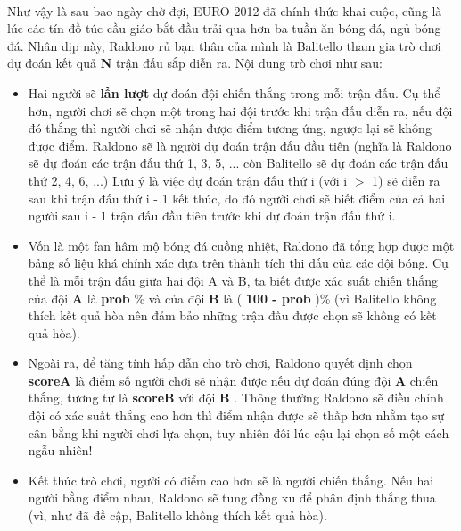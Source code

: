 

 

Như vậy là sau bao ngày chờ đợi, EURO 2012 đã chính thức khai cuộc, cũng là lúc các tín đồ túc cầu giáo bắt đầu trải qua hơn ba tuần ăn bóng đá, ngủ bóng đá. Nhân dịp này, Raldono rủ bạn thân của mình là Balitello tham gia trò chơi dự đoán kết quả \textbf{ N } trận đấu sắp diễn ra. Nội dung trò chơi như sau:
\begin{itemize}
	\item Hai người sẽ \textbf{ lần lượt } dự đoán đội chiến thắng trong mỗi trận đấu. Cụ thể hơn, người chơi sẽ chọn một trong hai đội trước khi trận đấu diễn ra, nếu đội đó thắng thì người chơi sẽ nhận được điểm tương ứng, ngược lại sẽ không được điểm. Raldono sẽ là người dự đoán trận đấu đầu tiên (nghĩa là Raldono sẽ dự đoán các trận đấu thứ 1, 3, 5, ... còn Balitello sẽ dự đoán các trận đấu thứ 2, 4, 6, ...) Lưu ý là việc dự đoán trận đấu thứ i (với i $>$ 1) sẽ diễn ra sau khi trận đấu thứ i - 1 kết thúc, do đó người chơi sẽ biết điểm của cả hai người sau i - 1 trận đấu đầu tiên trước khi dự đoán trận đấu thứ i.
\end{itemize}
\begin{itemize}
	\item Vốn là một fan hâm mộ bóng đá cuồng nhiệt, Raldono đã tổng hợp được một bảng số liệu khá chính xác dựa trên thành tích thi đấu của các đội bóng. Cụ thể là mỗi trận đấu giữa hai đội A và B, ta biết được xác suất chiến thắng của đội \textbf{ A } là \textbf{ prob } \% và của đội \textbf{ B } là ( \textbf{ 100 - prob } )\% (vì Balitello không thích kết quả hòa nên đảm bảo những trận đấu được chọn sẽ không có kết quả hòa).
\end{itemize}
\begin{itemize}
	\item Ngoài ra, để tăng tính hấp dẫn cho trò chơi, Raldono quyết định chọn \textbf{ scoreA } là điểm số người chơi sẽ nhận được nếu dự đoán đúng đội \textbf{ A } chiến thắng, tương tự là \textbf{ scoreB } với đội \textbf{ B } . Thông thường Raldono sẽ điều chỉnh đội có xác suất thắng cao hơn thì điểm nhận được sẽ thấp hơn nhằm tạo sự cân bằng khi người chơi lựa chọn, tuy nhiên đôi lúc cậu lại chọn số một cách ngẫu nhiên!
\end{itemize}
\begin{itemize}
	\item Kết thúc trò chơi, người có điểm cao hơn sẽ là người chiến thắng. Nếu hai người bằng điểm nhau, Raldono sẽ tung đồng xu để phân định thắng thua (vì, như đã đề cập, Balitello không thích kết quả hòa).
\end{itemize}
\begin{itemize}
\end{itemize}

